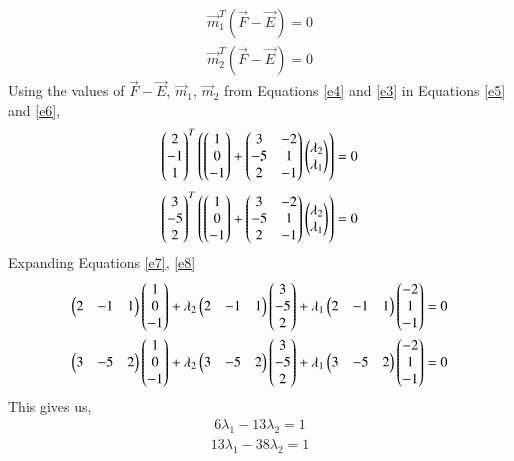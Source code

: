 \documentclass[journal,12pt,twocolumn]{IEEEtran}
\begin{document}
\begin{align}\label{e5}
    \vec{m}_1^T(\vec{F}-\vec{E}) = 0
\end{align}
\begin{align}\label{e6}
    \vec{m}_2^T(\vec{F}-\vec{E}) = 0
\end{align}
Using the values of $\vec{F}-\vec{E}$, $\vec{m}_1$, $\vec{m}_2$ from Equations \ref{e4} and \ref{e3} in Equations \ref{e5} and \ref{e6},
\begin{align}\label{e7}
    \begin{pmatrix}2 \\ -1 \\ 1\end{pmatrix}^T\left(\begin{pmatrix}1\\ 0 \\ -1\end{pmatrix}+\begin{pmatrix}3&-2\\-5&1\\2&-1\end{pmatrix}\begin{pmatrix}\lambda_2 \\ \lambda_1\end{pmatrix}\right) = 0
\end{align}
\begin{align}\label{e8}
    \begin{pmatrix}3 \\ -5 \\ 2\end{pmatrix}^T\left(\begin{pmatrix}1\\ 0 \\ -1\end{pmatrix}+\begin{pmatrix}3&-2\\-5&1\\2&-1\end{pmatrix}\begin{pmatrix}\lambda_2 \\ \lambda_1\end{pmatrix}\right) = 0
\end{align}
Expanding Equations \eqref{e7}, \eqref{e8}
\begin{align}
    \begin{pmatrix}2&-1& 1\end{pmatrix}\begin{pmatrix}1\\0\\-1\end{pmatrix} +\lambda_2\begin{pmatrix}2&-1&1\end{pmatrix}\begin{pmatrix}3\\-5\\2\end{pmatrix}+ \lambda_1\begin{pmatrix}2&-1&1\end{pmatrix}\begin{pmatrix}-2\\1\\-1\end{pmatrix}= 0 \\
    \begin{pmatrix}3&-5&2\end{pmatrix}\begin{pmatrix}1\\0\\-1\end{pmatrix} +\lambda_2\begin{pmatrix}3&-5&2\end{pmatrix}\begin{pmatrix}3\\-5\\2\end{pmatrix}+\lambda_1\begin{pmatrix}3&-5&2\end{pmatrix}\begin{pmatrix}-2\\1\\-1\end{pmatrix}= 0
\end{align}
This gives us,
\begin{align}\label{e9}
    6\lambda_1 -13\lambda_2 = 1
\end{align}
\begin{align}\label{e10}
   13\lambda_1 -38\lambda_2 = 1
\end{align}
\end{document}
